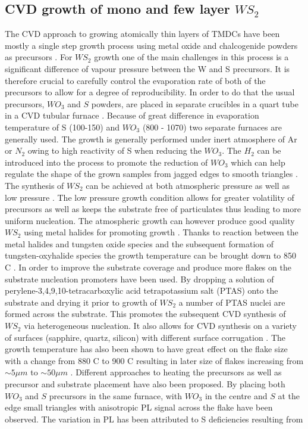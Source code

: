 \subsection{CVD growth of mono and few layer $WS_2$}
The CVD approach to growing atomically thin layers of TMDCs have been mostly a single step growth process using metal oxide and chalcogenide powders as precursors \cite{Reale2016}\cite{doi:10.1021/nn4046002}\cite{Cong2013}\cite{Rong2014}\cite{Dumcenco2015}\cite{Lee2012}\cite{Ling2014}\cite{Najmaei2013}\cite{Ji2013}\cite{Zhang2014a}\cite{Yu2013}. For $WS_2$ growth one of the main challenges in this process is a significant difference of vapour pressure between the W and S precursors. It is therefore crucial to carefully control the evaporation rate of both of the precursors to allow for a degree of reproducibility. In order to do that the usual precursors, $WO_3$ and $S$ powders, are placed in separate crucibles in a quart tube in a CVD tubular furnace \cite{Bosi2015}\cite{Shi2015}. Because of great difference in evaporation temperature of S (100-150{\degree}) and $WO_3$ (800 - 1070{\degree}) two separate furnaces are generally used. The growth is generally performed under inert atmosphere of Ar or $N_2$ owing to high reactivity of S when reducing the $WO_3$. The $H_2$ can be introduced into the process to promote the reduction of $WO_3$ which can help regulate the shape of the grown samples from jagged edges to smooth triangles \cite{doi:10.1021/nn403454e}. The synthesis of $WS_2$ can be achieved at both atmospheric pressure as well as low pressure \cite{Bosi2015}\cite{Shi2015}. The low pressure growth condition allows for greater volatility of precursors as well as keeps the substrate free of particulates thus leading to more uniform nucleation. The atmospheric growth can however produce good quality $WS_2$ using metal halides for promoting growth \cite{Li2015}. Thanks to reaction between the metal halides and tungsten oxide species and the subsequent formation of tungsten-oxyhalide species the growth temperature can be brought down to 850 {\degree}C \cite{Li2015}. In order to improve the substrate coverage and produce more flakes on the substrate nucleation promoters have been used. By dropping a solution of perylene-3,4,9,10-tetracarboxylic acid tetrapotassium salt (PTAS) onto the substrate and drying it prior to growth of $WS_2$ a number of PTAS nuclei are formed across the substrate. This promotes the subsequent CVD synthesis of $WS_2$ via heterogeneous nucleation. It also allows for CVD synthesis on a variety of surfaces (sapphire, quartz, silicon) with different surface corrugation \cite{Lee2013}. The growth temperature has also been shown to have great effect on the flake size with a change from 880 {\degree}C to 900 {\degree}C resulting in later size of flakes increasing from $\sim 5 \mu m$ to $\sim 50 \mu m$ \cite{doi:10.1021/nn403454e}. Different approaches to heating the precursors as well as precursor and substrate placement have also been proposed. By placing both $WO_3$ and $S$ precursors in the same furnace, with $WO_3$ in the centre and $S$ at the edge small triangles with anisotropic PL signal across the flake have been observed. The variation in PL has been attributed to S deficiencies resulting from 